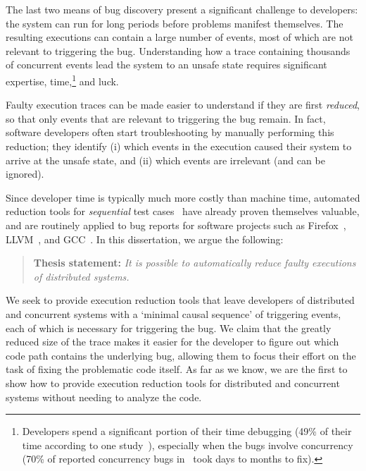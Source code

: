 The last two means of bug discovery present a significant challenge to
developers: the system can run for
long periods before problems manifest themselves. The resulting executions
can contain a large number of events, most of which are not relevant to triggering the
bug. Understanding how a trace containing thousands of concurrent events lead
the system to an unsafe state requires significant expertise, time,\footnote{Developers spend a significant portion of their time
debugging (49\% of their time according to one
study~\cite{LaToza:2006:MMM:1134285.1134355}), especially when the bugs
involve concurrency (70\% of reported concurrency bugs
in~\cite{msoft_concurrency} took days to months to fix).}
and luck.


Faulty execution traces can be made %
easier to understand if they are first
{\em reduced}, so that only events that are relevant to triggering the bug remain.
In fact, software developers often start troubleshooting by manually performing this
reduction; they identify
(i) which events in the execution caused their system to arrive at the unsafe
state, and (ii) which events are irrelevant (and can be ignored).

Since developer time is typically much more costly than machine time,
automated reduction tools for {\em sequential}
test
cases~\cite{claessen2000quickcheck,Zeller:2002:SIF:506201.506206,yang2011finding}
have already proven themselves valuable,
and are routinely applied to bug reports for software projects such as Firefox~\cite{firefox_reduction}, LLVM~\cite{bugpoint}, and GCC~\cite{gcc_reduction}.
In this dissertation, we argue the following:

\begin{quote}
{\textbf{Thesis statement:}} \textit{It is possible to automatically reduce faulty
executions of distributed systems.}
\end{quote}

We seek to provide execution reduction tools that leave developers of
distributed and concurrent systems with a `minimal causal sequence' of triggering events, each of which is necessary for triggering the bug.
We claim that the greatly reduced size of the trace makes it easier for the developer to figure out which code path contains the underlying bug, allowing them to focus their effort on the task of fixing the problematic code itself.
As far as we know, we are the first to show how to provide execution
reduction tools
for distributed and concurrent systems without needing to analyze the code.

